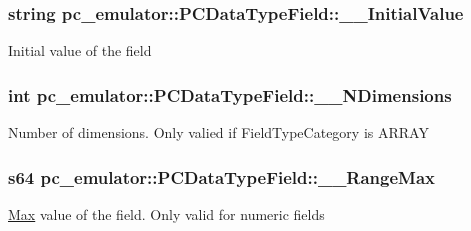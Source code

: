 \subsubsection[{\texorpdfstring{\+\_\+\+\_\+\+Initial\+Value}{__InitialValue}}]{\setlength{\rightskip}{0pt plus 5cm}string pc\+\_\+emulator\+::\+P\+C\+Data\+Type\+Field\+::\+\_\+\+\_\+\+Initial\+Value}\hypertarget{classpc__emulator_1_1PCDataTypeField_aed29902b81555d1af0ff3cd31e406cce}{}\label{classpc__emulator_1_1PCDataTypeField_aed29902b81555d1af0ff3cd31e406cce}
Initial value of the field 
\subsubsection[{\texorpdfstring{\+\_\+\+\_\+\+N\+Dimensions}{__NDimensions}}]{\setlength{\rightskip}{0pt plus 5cm}int pc\+\_\+emulator\+::\+P\+C\+Data\+Type\+Field\+::\+\_\+\+\_\+\+N\+Dimensions}\hypertarget{classpc__emulator_1_1PCDataTypeField_aaa0cf080c4e649f740e03f2916725c15}{}\label{classpc__emulator_1_1PCDataTypeField_aaa0cf080c4e649f740e03f2916725c15}
Number of dimensions. Only valied if Field\+Type\+Category is A\+R\+R\+AY 
\subsubsection[{\texorpdfstring{\+\_\+\+\_\+\+Range\+Max}{__RangeMax}}]{\setlength{\rightskip}{0pt plus 5cm}s64 pc\+\_\+emulator\+::\+P\+C\+Data\+Type\+Field\+::\+\_\+\+\_\+\+Range\+Max}\hypertarget{classpc__emulator_1_1PCDataTypeField_a05e85a316b84c14f57fe59167e9a1685}{}\label{classpc__emulator_1_1PCDataTypeField_a05e85a316b84c14f57fe59167e9a1685}
\hyperlink{classpc__emulator_1_1Max}{Max} value of the field. Only valid for numeric fields 
